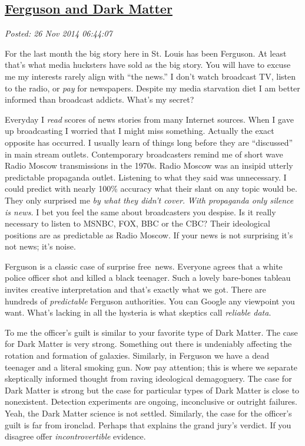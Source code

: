%

\subsection*{\href{https://bakerjd99.wordpress.com/2014/11/26/ferguson-and-dark-matter/}{Ferguson and Dark Matter}}


\noindent\emph{Posted: 26 Nov 2014 06:44:07}
\vspace{6pt}

For the last month the big story here in St. Louis has been Ferguson. At
least that's what media hucksters have sold as the big story. You will
have to excuse me my interests rarely align with ``the news.'' I don't
watch broadcast TV, listen to the radio, or \emph{pay} for newspapers.
Despite my media starvation diet I am better informed than 
broadcast addicts. What's my secret?

Everyday I \emph{read} scores of news stories from many Internet
sources. When I gave up broadcasting I worried that I
might miss something. Actually the exact opposite has occurred. I
usually learn of things long before they are ``discussed'' in main
stream outlets. Contemporary broadcasters remind me of short wave Radio
Moscow transmissions in the 1970s. Radio Moscow was an insipid utterly
predictable propaganda outlet. Listening to what they said was
unnecessary. I could predict with nearly 100\% accuracy what their slant
on any topic would be. They only surprised me \emph{by what they didn't
cover.} \emph{With propaganda only silence is news.} I bet you feel the
same about broadcasters you despise. Is it really necessary to
listen to MSNBC, FOX, BBC or the CBC? Their ideological positions are
as predictable as Radio Moscow. If your news is not
surprising it's not news; it's noise.

Ferguson is a classic case of surprise free~news. Everyone agrees that a
white police officer shot and killed a black teenager. Such a lovely
bare-bones tableau invites creative interpretation and that's exactly
what we got. There are hundreds of \emph{predictable} Ferguson
authorities. You can Google any viewpoint you want. What's lacking in
all the hysteria is what skeptics call \emph{reliable data}.

To me the officer's guilt is similar to your favorite type of Dark
Matter. The case for Dark Matter is very strong. Something out there is
undeniably affecting the rotation and formation of galaxies. Similarly, in Ferguson
we have a dead teenager and a literal smoking gun. Now pay
attention; this is where we separate skeptically informed thought from
raving ideological demagoguery. The case for Dark Matter is strong but
the case for particular types of Dark Matter is close to nonexistent.
Detection experiments are ongoing, inconclusive or outright failures.
Yeah, the Dark Matter science is not settled. Similarly, the case for
the officer's guilt is far from ironclad. Perhaps that explains the
grand jury's verdict. If you disagree offer \emph{incontrovertible}
evidence.

